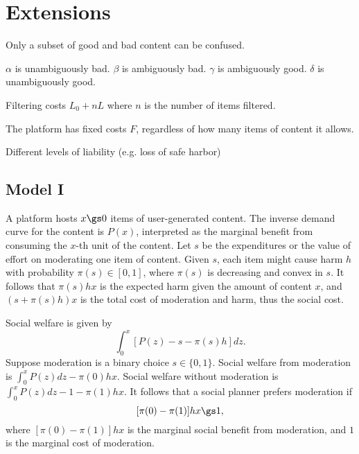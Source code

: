 \fi




\section{Extensions}

Only a subset of good and bad content can be confused.

$\alpha$ is unambiguously bad.
$\beta$ is ambiguously bad.
$\gamma$ is ambiguously good.
$\delta$ is unambiguously good.

Filtering costs $L_0 + nL$ where $n$ is the number of items filtered.

The platform has fixed costs $F$, regardless of how many items of content it allows.

Different levels of liability (e.g. loss of safe harbor)









\subsection{Model I}
A platform hosts $x\gs 0$ items of user-generated content. 
The inverse demand curve for the content is $P(x)$, interpreted as the marginal benefit from consuming the $x$-th unit of the content. 
Let $s$ be the expenditures or the value of effort on moderating one item of content.
Given $s$, each item might cause harm $h$ with probability $\pi(s)\in[0,1]$, where $\pi(s)$ is decreasing and convex in $s$. It follows that $\pi(s)hx$ is the expected harm given the amount of content $x$, and $(s+\pi(s)h)x$ is the total cost of moderation and harm, thus the social cost.

Social welfare is given by 
\begin{equation}
    \int_0^x [P(z)-s-\pi(s)h]dz.
\end{equation}
Suppose moderation is a binary choice $s\in\{0,1\}$. Social welfare from moderation is $\int_0^x P(z)dz-\pi(0)hx$. Social welfare without moderation is $\int_0^x P(z)dz-1-\pi(1)hx$. It follows that a social planner prefers moderation if 
\begin{equation}\label{eqn:efficiency_1}
    [\pi(0)-\pi(1)]hx\gs 1,
\end{equation}
where $[\pi(0)-\pi(1)]hx$ is the marginal social benefit from moderation, and $1$ is the marginal cost of moderation. 

